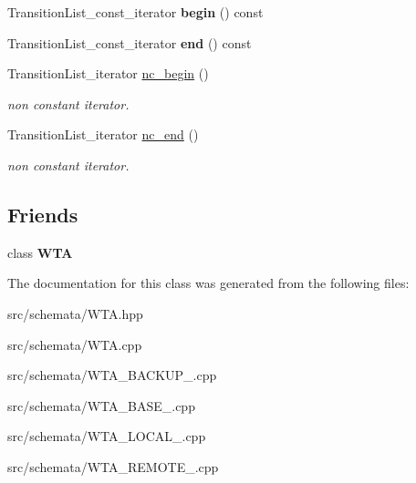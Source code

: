 \begin{DoxyCompactItemize}
\mbox{\label{classTransitionList_a7fcbeb316dcf76418642f1f2056a5fda}} 
Transition\+List\+\_\+const\+\_\+iterator {\bfseries begin} () const
\item 
\mbox{\label{classTransitionList_ad823ed73ac180f6580ba03f8d1c6f11d}} 
Transition\+List\+\_\+const\+\_\+iterator {\bfseries end} () const
\item 
\mbox{\label{classTransitionList_a0db8b4656919b96fc29654126a039930}} 
Transition\+List\+\_\+iterator \mbox{\hyperlink{classTransitionList_a0db8b4656919b96fc29654126a039930}{nc\+\_\+begin}} ()
\begin{DoxyCompactList}\small\item\em non constant iterator. \end{DoxyCompactList}\item 
\mbox{\label{classTransitionList_a618b9838609de2fd39d9d0ac303798e1}} 
Transition\+List\+\_\+iterator \mbox{\hyperlink{classTransitionList_a618b9838609de2fd39d9d0ac303798e1}{nc\+\_\+end}} ()
\begin{DoxyCompactList}\small\item\em non constant iterator. \end{DoxyCompactList}\end{DoxyCompactItemize}
\subsection*{Friends}
\begin{DoxyCompactItemize}
\item 
\mbox{\label{classTransitionList_a952da284347c0997c1630edc02aa30ab}} 
class {\bfseries W\+TA}
\end{DoxyCompactItemize}


The documentation for this class was generated from the following files\+:\begin{DoxyCompactItemize}
\item 
src/schemata/W\+T\+A.\+hpp\item 
src/schemata/W\+T\+A.\+cpp\item 
src/schemata/W\+T\+A\+\_\+\+B\+A\+C\+K\+U\+P\+\_.\+cpp\item 
src/schemata/W\+T\+A\+\_\+\+B\+A\+S\+E\+\_.\+cpp\item 
src/schemata/W\+T\+A\+\_\+\+L\+O\+C\+A\+L\+\_.\+cpp\item 
src/schemata/W\+T\+A\+\_\+\+R\+E\+M\+O\+T\+E\+\_.\+cpp\end{DoxyCompactItemize}
